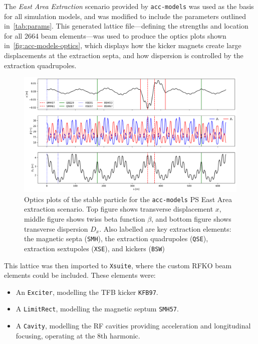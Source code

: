 \documentclass[11pt]{report}
\begin{document}
The \textit{East Area Extraction} scenario provided by \verb|acc-models| was used as the basis for all simulation models, and was modified to include the parameters outlined in~\autoref{tab:params}. This generated lattice file---defining the strengths and location for all 2664 beam elements---was used to produce the optics plots shown in~\autoref{fig:acc-models-optics}, which displays how the kicker magnets create large displacements at the extraction septa, and how dispersion is controlled by the extraction quadrupoles.

\begin{figure}[h]
  \centering
  \includegraphics[width=1.1\linewidth]{optics.png}
  \cprotect\caption{Optics plots of the stable particle for the \verb|acc-models| PS East Area extraction scenario. Top figure shows transverse displacement $x$, middle figure shows twiss beta function $\beta$, and bottom figure shows transverse dispersion $D_x$. Also labelled are key extraction elements: the magnetic septa (\verb|SMH|), the extraction quadrupoles (\verb|QSE|), extraction sextupoles (\verb|XSE|), and kickers (\verb|BSW|)}\label{fig:acc-models-optics}
\end{figure}

This lattice was then imported to \verb|Xsuite|, where the custom RFKO beam elements could be included. These elements were:
\begin{itemize}
  \item An \verb|Exciter|, modelling the TFB kicker \verb|KFB97|.
  \item A \verb|LimitRect|, modelling the magnetic septum \verb|SMH57|.
  \item A \verb|Cavity|, modelling the RF cavities providing acceleration and longitudinal focusing, operating at the 8th harmonic.
\end{itemize}
\end{document}
